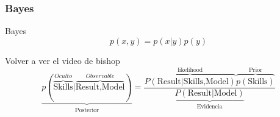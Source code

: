 \documentclass{beamer}
\begin{document}
\begin{frame}
\frametitle{Bayes}

Bayes
\begin{equation*}
p(x,y) = p(x|y) p(y)
\end{equation*}

Volver a ver el video de bishop
\begin{equation*}
\underbrace{p(\overbrace{\text{Skills}}^{Oculto}|\overbrace{\text{Result,Model}}^{Observable})}_{\text{Posterior}} = \frac{\overbrace{P(\text{Result}|\text{Skills,Model})}^{\text{likelihood}}\overbrace{p(\text{Skills})}^{\text{Prior}}}{\underbrace{P(\text{Result}|\text{Model})}_{\text{Evidencia}}}
\end{equation*}

\end{frame}

\end{document}
